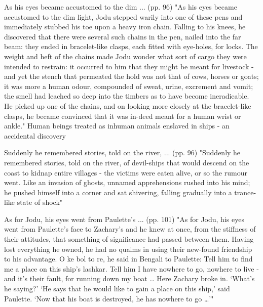 As his eyes became accustomed to the dim ... (pp. 96)
"As his eyes became accustomed to the dim light, Jodu stepped warily into one of these pens and immediately stubbed his toe upon a heavy iron chain. Falling to his knees, he discovered that there were several such chains in the pen, nailed into the far beam: they ended in bracelet-like clasps, each fitted with eye-holes, for locks. The weight and heft of the chains made Jodu wonder what sort of cargo they were intended to restrain: it occurred to him that they might be meant for livestock -and yet the stench that permeated the hold was not that of cows, horses or goats; it was more a human odour, compounded of sweat, urine, excrement and vomit; the smell had leached so deep into the timbers as to have become ineradicable. He picked up one of the chains, and on looking more closely at the bracelet-like clasps, he became convinced that it was in-deed meant for a human wrist or ankle."
Human beings treated as inhuman animals enslaved in ships - an accidental discovery

Suddenly he remembered stories, told on the river, ... (pp. 96)
"Suddenly he remembered stories, told on the river, of devil-ships that would descend on the coast to kidnap entire villages - the victims were eaten alive, or so the rumour went. Like an invasion of ghosts, unnamed apprehensions rushed into his mind; he pushed himself into a corner and sat shivering, falling gradually into a trance-like state of shock"

As for Jodu, his eyes went from Paulette’s ... (pp. 101)
"As for Jodu, his eyes went from Paulette’s face to Zachary’s and he knew at once, from the stiffness of their attitudes, that something of significance had passed between them. Having lost everything he owned, he had no qualms in using their new-found friendship to his advantage. O ke bol to re, he said in Bengali to Paulette: Tell him to find me a place on this ship’s lashkar. Tell him I have nowhere to go, nowhere to live - and it’s their fault, for running down my boat … Here Zachary broke in. ‘What’s he saying?’ ‘He says that he would like to gain a place on this ship,’ said Paulette. ‘Now that his boat is destroyed, he has nowhere to go …’"

